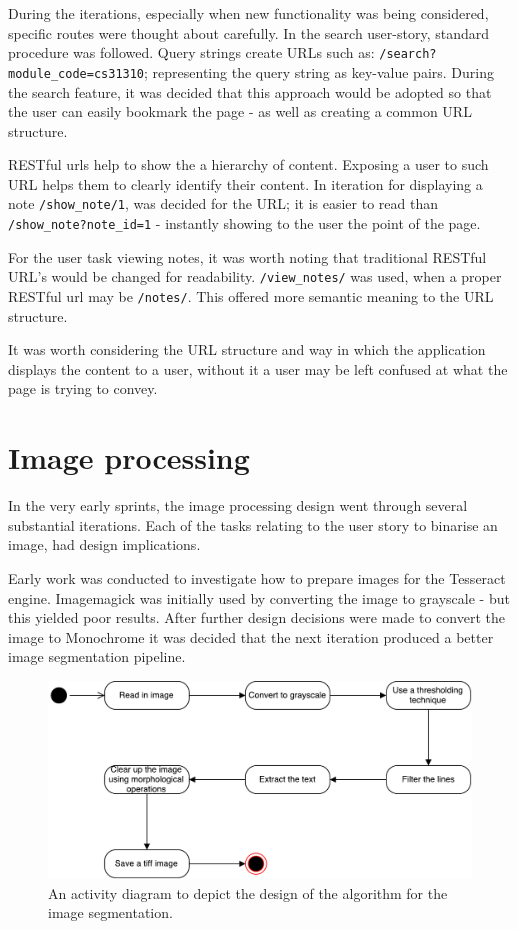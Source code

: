 During the iterations, especially when new functionality was being considered, specific routes were thought about carefully. In the search user-story, standard procedure was followed. Query strings create URLs such as: \texttt{/search?module\_code=cs31310}; representing the query string as key-value pairs. During the search feature, it was decided that this approach would be adopted so that the user can easily bookmark the page - as well as creating a common URL structure.

RESTful urls help to show the a hierarchy of content. Exposing a user to such URL helps them to clearly identify their content. In iteration for displaying a note \texttt{/show\_note/1}, was decided for the URL; it is easier to read than  \texttt{/show\_note?note\_id=1} - instantly showing to the user the point of the page.

For the user task viewing notes, it was worth noting that traditional RESTful URL's would be changed for readability. \texttt{/view\_notes/} was used, when a proper RESTful url may be \texttt{/notes/}. This offered more semantic meaning to the URL structure.

It was worth considering the URL structure and way in which the application displays the content to a user, without it a user may be left confused at what the page is trying to convey.

\section{Image processing}
In the very early sprints, the image processing design went through several substantial iterations. Each of the tasks relating to the user story to binarise an image, had design implications.

Early work was conducted to investigate how to prepare images for the Tesseract engine. Imagemagick was initially used by converting the image to grayscale - but this yielded poor results. After further design decisions were made to convert the image to Monochrome it was decided that the next iteration produced a better image segmentation pipeline.

\begin{figure}[H]
  \centering
  \includegraphics[scale=0.4]{images/image_binarisation_activity.pdf}
  \caption{An activity diagram to depict the design of the algorithm for the image segmentation.}
  \label{fig:activity_binarise}
\end{figure}

